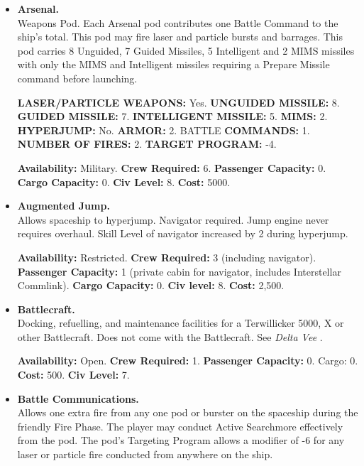 \begin{itemize}
\item\textbf{Arsenal.}\\
  Weapons Pod. Each Arsenal pod contributes one Battle Command to the
  ship's total. This pod may fire laser and particle bursts and
  barrages. This pod carries 8 Unguided, 7 Guided Missiles, 5
  Intelligent and 2 MIMS missiles with only the MIMS and Intelligent
  missiles requiring a Prepare Missile command before launching.
  
  \textbf{LASER/PARTICLE WEAPONS:} Yes. \textbf{UNGUIDED MISSILE:} 8.
  \textbf{GUIDED MISSILE:} 7. \textbf{INTELLIGENT MISSILE:} 5.
  \textbf{MIMS:} 2.  \textbf{HYPERJUMP:} No. \textbf{ARMOR:} 2. BATTLE
  \textbf{COMMANDS:} 1. \textbf{NUMBER OF FIRES:} 2. \textbf{TARGET
    PROGRAM:} -4.
  
  \textbf{Availability:} Military. \textbf{Crew Required:} 6.
  \textbf{Passenger Capacity:} 0.  \textbf{Cargo Capacity:} 0.
  \textbf{Civ Level:} 8. \textbf{Cost:} 5000.
  
\item\textbf{\hypertarget{tag:pod-augmented-jump}{Augmented Jump}.}\\
  Allows spaceship to hyperjump. Navigator required. Jump engine never
  requires overhaul. Skill Level of navigator increased by 2 during
  hyperjump.
  
  \textbf{Availability:} Restricted. \textbf{Crew Required:} 3
  (including navigator).  \textbf{Passenger Capacity:} 1 (private
  cabin for navigator, includes Interstellar Commlink). \textbf{Cargo
  Capacity:} 0.  \textbf{Civ level:} 8.
  \textbf{Cost:} 2,500.
  
  

\item\textbf{Battlecraft.}\\
  Docking, refuelling, and maintenance facilities for a Terwillicker
  5000, X or other Battlecraft. Does not come with the Battlecraft.
  See \emph{Delta Vee} .

  
  \textbf{Availability:} Open. \textbf{Crew Required:} 1.
  \textbf{Passenger Capacity:} 0. Cargo: 0. \textbf{Cost:} 500.
  \textbf{Civ Level:} 7.
  
  

\item\textbf{Battle Communications.}\\
  Allows one extra fire from any one pod or burster on the spaceship
  during the friendly Fire Phase. The player may conduct Active
  Searchmore effectively from the pod. The pod's Targeting Program
  allows a modifier of -6 for any laser or particle fire conducted
  from anywhere on the ship.
  

\end{itemize}
